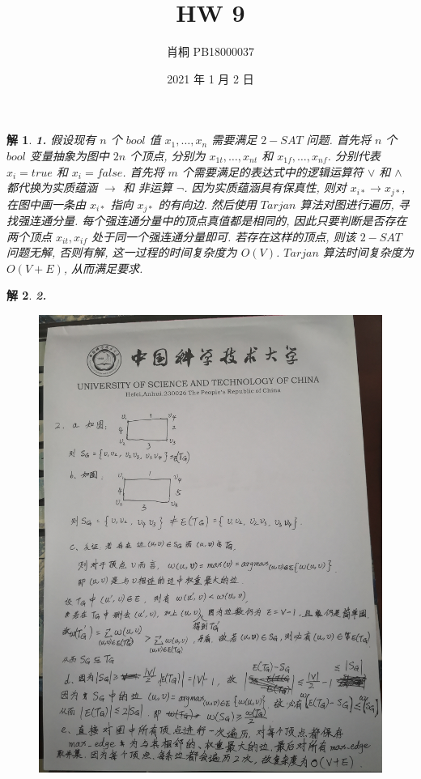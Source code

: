 \documentclass{article}
\begin{document}
    \title{HW 9}
    \author{肖桐 PB18000037}
    \date{2021 年 1 月 2 日}
    \maketitle

    \newtheorem*{solution}{解}

    \begin{solution}\textnormal{\textbf{1.}}
        假设现有 $n$ 个 $bool$ 值 $x_1, \dots, x_n$ 需要满足 $2-SAT$ 问题. 首先将 $n$ 个 $bool$ 变量抽象为图中 $2n$ 个顶点,
        分别为 $x_{1t}, \dots, x_{nt}$ 和 $x_{1f}, \dots, x_{nf}$. 分别代表 $x_i = true$ 和 $x_i = false$.\newline
        首先将 $m$ 个需要满足的表达式中的逻辑运算符 $\vee$ 和 $\wedge$ 都代换为实质蕴涵 $\to$ 和 非运算 $\neg$.\newline
        因为实质蕴涵具有保真性, 则对 $x_{i*} \to x_{j*}$, 在图中画一条由 $x_{i*}$ 指向 $x_{j*}$ 的有向边.\newline
        然后使用 $Tarjan$ 算法对图进行遍历, 寻找强连通分量. 每个强连通分量中的顶点真值都是相同的, 因此只要判断是否存在两个顶点 $x_{it}, x_{if}$ 处于同一个强连通分量即可.\newline
        若存在这样的顶点, 则该 $2-SAT$ 问题无解, 否则有解, 这一过程的时间复杂度为 $O(V)$.\newline
        $Tarjan$ 算法时间复杂度为 $O(V + E)$, 从而满足要求.
    \end{solution}
    \begin{solution}\textnormal{\textbf{2.}}
        \begin{figure}[h]
            \includegraphics*[scale=0.2]{1.jpg}
        \end{figure}
    \end{solution}
\end{document}

